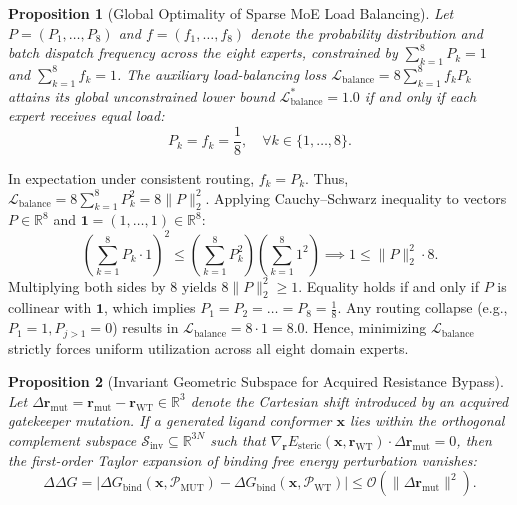 \documentclass[10pt,journal,compsoc]{IEEEtran}
\newtheorem{proposition}{Proposition}
\begin{document}
\begin{proposition}[Global Optimality of Sparse MoE Load Balancing]
\label{prop:moe_balance}
Let $P = (P_1, \dots, P_8)$ and $f = (f_1, \dots, f_8)$ denote the probability distribution and batch dispatch frequency across the eight experts, constrained by $\sum_{k=1}^8 P_k = 1$ and $\sum_{k=1}^8 f_k = 1$. The auxiliary load-balancing loss $\mathcal{L}_{\text{balance}} = 8 \sum_{k=1}^8 f_k P_k$ attains its global unconstrained lower bound $\mathcal{L}_{\text{balance}}^* = 1.0$ if and only if each expert receives equal load:
\begin{equation}
P_k = f_k = \frac{1}{8}, \quad \forall k \in \{1, \dots, 8\}.
\end{equation}
\end{proposition}

\begin{IEEEproof}
In expectation under consistent routing, $f_k = P_k$. Thus, $\mathcal{L}_{\text{balance}} = 8 \sum_{k=1}^8 P_k^2 = 8 \|P\|_2^2$. Applying Cauchy--Schwarz inequality to vectors $P \in \mathbb{R}^8$ and $\mathbf{1} = (1, \dots, 1) \in \mathbb{R}^8$:
\begin{equation*}
\left( \sum_{k=1}^8 P_k \cdot 1 \right)^2 \le \left( \sum_{k=1}^8 P_k^2 \right) \left( \sum_{k=1}^8 1^2 \right) \implies 1 \le \|P\|_2^2 \cdot 8.
\end{equation*}
Multiplying both sides by 8 yields $8 \|P\|_2^2 \ge 1$. Equality holds if and only if $P$ is collinear with $\mathbf{1}$, which implies $P_1 = P_2 = \dots = P_8 = \frac{1}{8}$. Any routing collapse (e.g., $P_1 = 1, P_{j > 1} = 0$) results in $\mathcal{L}_{\text{balance}} = 8 \cdot 1 = 8.0$. Hence, minimizing $\mathcal{L}_{\text{balance}}$ strictly forces uniform utilization across all eight domain experts.
\end{IEEEproof}

\begin{proposition}[Invariant Geometric Subspace for Acquired Resistance Bypass]
\label{prop:resistance_invariance}
Let $\Delta \mathbf{r}_{\text{mut}} = \mathbf{r}_{\text{mut}} - \mathbf{r}_{\text{WT}} \in \mathbb{R}^3$ denote the Cartesian shift introduced by an acquired gatekeeper mutation. If a generated ligand conformer $\mathbf{x}$ lies within the orthogonal complement subspace $\mathcal{S}_{\text{inv}} \subseteq \mathbb{R}^{3N}$ such that $\nabla_{\mathbf{r}} E_{\text{steric}}(\mathbf{x}, \mathbf{r}_{\text{WT}}) \cdot \Delta \mathbf{r}_{\text{mut}} = 0$, then the first-order Taylor expansion of binding free energy perturbation vanishes:
\begin{equation}
\Delta \Delta G = |\Delta G_{\text{bind}}(\mathbf{x}, \mathcal{P}_{\text{MUT}}) - \Delta G_{\text{bind}}(\mathbf{x}, \mathcal{P}_{\text{WT}})| \le \mathcal{O}(\|\Delta \mathbf{r}_{\text{mut}}\|^2).
\end{equation}
\end{proposition}
\end{document}
